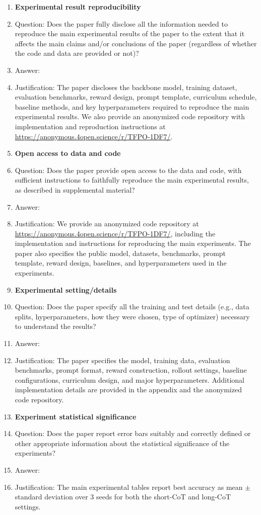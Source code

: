 \begin{enumerate}
\item {\bf Experimental result reproducibility}
    \item[] Question: Does the paper fully disclose all the information needed to reproduce the main experimental results of the paper to the extent that it affects the main claims and/or conclusions of the paper (regardless of whether the code and data are provided or not)?
    \item[] Answer: \answerYes{}
    \item[] Justification: The paper discloses the backbone model, training dataset, evaluation benchmarks, reward design, prompt template, curriculum schedule, baseline methods, and key hyperparameters required to reproduce the main experimental results. We also provide an anonymized code repository with implementation and reproduction instructions at \url{https://anonymous.4open.science/r/TFPO-1DF7/}.

\item {\bf Open access to data and code}
    \item[] Question: Does the paper provide open access to the data and code, with sufficient instructions to faithfully reproduce the main experimental results, as described in supplemental material?
    \item[] Answer: \answerYes{}
    \item[] Justification: We provide an anonymized code repository at \url{https://anonymous.4open.science/r/TFPO-1DF7/}, including the implementation and instructions for reproducing the main experiments. The paper also specifies the public model, datasets, benchmarks, prompt template, reward design, baselines, and hyperparameters used in the experiments.

\item {\bf Experimental setting/details}
    \item[] Question: Does the paper specify all the training and test details (e.g., data splits, hyperparameters, how they were chosen, type of optimizer) necessary to understand the results?
    \item[] Answer: \answerYes{}
    \item[] Justification: The paper specifies the model, training data, evaluation benchmarks, prompt format, reward construction, rollout settings, baseline configurations, curriculum design, and major hyperparameters. Additional implementation details are provided in the appendix and the anonymized code repository.

\item {\bf Experiment statistical significance}
    \item[] Question: Does the paper report error bars suitably and correctly defined or other appropriate information about the statistical significance of the experiments?
    \item[] Answer: \answerYes{}
    \item[] Justification: The main experimental tables report best accuracy as mean $\pm$ standard deviation over 3 seeds for both the short-CoT and long-CoT settings. 


\end{enumerate}
